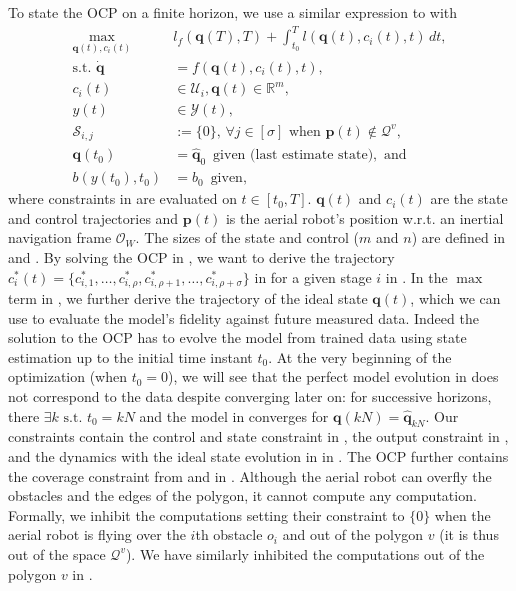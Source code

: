 To state the OCP on a finite horizon, we use a similar expression to  with
\begin{subequations}\label{eq:ocp-output-mpc}\begin{align}
  \max_{\mathbf{q}(t),c_i(t)}&{l_f(\mathbf{q}(T),T)+\int_{t_0}^T{l(\mathbf{q}(t),c_i(t),t)\,dt}},\\
  \text{s.t. }\dot{\mathbf{q}}&=f(\mathbf{q}(t),c_i(t),t),\label{eq:dyn-evol}\\
  c_i(t)&\in\mathcal{U}_i,\mathbf{q}(t)\in\mathbb{R}^m,\label{eq:state-cont-const-mpc}\\
  y(t)&\in\mathcal{Y}(t),\label{eq:batt-const-mpc}\\
  \mathcal{S}_{i,j}&:=\{0\},\,\forall j \in [\sigma]\text{ when }\mathbf{p}(t)\notin\mathcal{Q}^v,\label{eq:polyg-const}\\
  \mathbf{q}(t_0)&=\hat{\mathbf{q}}_0\,\,\,\text{given (last estimate state)},\text{ and}\\
  b(y(t_0),t_0)&=b_0\,\,\,\text{given},
\end{align}\end{subequations}
where constraints in  are evaluated on $t\in[t_0,T]$. $\mathbf{q}(t)$ and $c_i(t)$ are the state and control trajectories and $\mathbf{p}(t)$ is the aerial robot's position w.r.t. an inertial navigation frame $\mathcal{O}_W$. The sizes of the state and control ($m$ and $n$) are defined in  and . By solving the OCP in , we want to derive the trajectory $c_i^*(t)=\{c^*_{i,1},\dots,c^*_{i,\rho},c^*_{i,\rho+1},\dots,c^*_{i,\rho+\sigma}\}$ in  for a given stage $i$ in . In the $\max$ term in , we further derive the trajectory of the ideal state $\mathbf{q}(t)$, which we can use to evaluate the model's fidelity against future measured data. Indeed the solution to the OCP has to  evolve the model from trained data using state estimation up to the initial time instant $t_0$. At the very beginning of the optimization (when $t_0=0$), we will see that the perfect model evolution in  does not correspond to the data despite converging later on: for successive horizons, there $\exists k\text{ s.t. }t_0=kN$ and the model in  converges for $\mathbf{q}(kN)=\hat{\mathbf{q}}_{kN}$. Our constraints contain the control and state constraint in , the output constraint in , and the dynamics with the ideal state evolution in  in . The OCP further contains the coverage constraint from  and  in . Although the aerial robot can overfly the obstacles and the edges of the polygon, it cannot compute any computation. Formally, we inhibit the computations setting their constraint to $\{0\}$ when the aerial robot is flying over the $i$th obstacle $o_i$ and out of the polygon $v$ (it is thus out of the space $\mathcal{Q}^v$). We have similarly inhibited the computations out of the polygon $v$ in .

